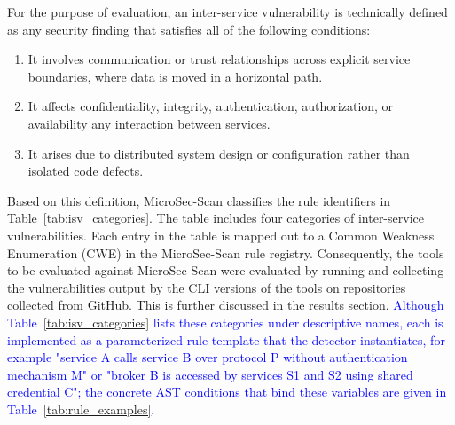 \documentclass[preprint,12pt]{elsarticle}
\newcommand{\new}[1]{\textcolor{blue}{#1}}
\begin{document}
For the purpose of evaluation, an inter-service vulnerability is technically defined as any security finding that satisfies all of the following conditions:
\begin{enumerate}
    \item It involves communication or trust relationships across explicit service boundaries, where data is moved in a horizontal path.
    \item It affects confidentiality, integrity, authentication, authorization, or availability any interaction between services.
    \item It arises due to distributed system design or configuration rather than isolated code defects.
\end{enumerate}

Based on this definition, MicroSec-Scan classifies the rule identifiers in Table~\ref{tab:isv_categories}. The table includes four categories of inter-service vulnerabilities. Each entry in the table is mapped out to a Common Weakness Enumeration (CWE) in the MicroSec-Scan rule registry. Consequently, the tools to be evaluated against MicroSec-Scan were evaluated by running and collecting the vulnerabilities output by the CLI versions of the tools on repositories collected from GitHub. This is further discussed in the results section. \new{Although Table~\ref{tab:isv_categories} lists these categories under descriptive names, each is implemented as a parameterized rule template that the detector instantiates, for example "service A calls service B over protocol P without authentication mechanism M" or "broker B is accessed by services S1 and S2 using shared credential C"; the concrete AST conditions that bind these variables are given in Table~\ref{tab:rule_examples}.} 
\end{document}
